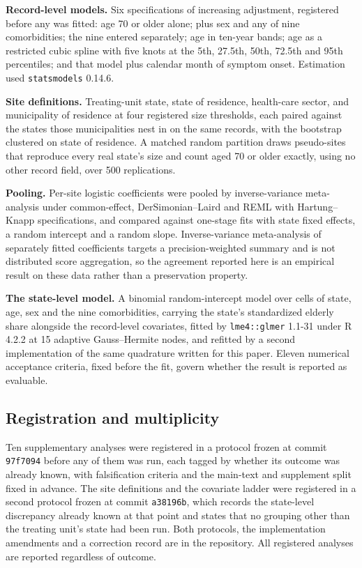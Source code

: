 \documentclass[11pt]{article}
\begin{document}
\textbf{Record-level models.}  Six specifications of increasing
adjustment, registered before any was fitted: age 70 or older alone;
plus sex and any of nine comorbidities; the nine entered separately;
age in ten-year bands; age as a restricted cubic spline with five knots
at the 5th, 27.5th, 50th, 72.5th and 95th percentiles; and that model
plus calendar month of symptom onset.  Estimation used
\texttt{statsmodels} 0.14.6.

\textbf{Site definitions.}  Treating-unit state, state of residence,
health-care sector, and municipality of residence at four registered
size thresholds, each paired against the states those municipalities
nest in on the same records, with the bootstrap clustered on state of
residence.  A matched random partition draws pseudo-sites that
reproduce every real state's size and count aged 70 or older exactly,
using no other record field, over 500 replications.

\textbf{Pooling.}  Per-site logistic coefficients were pooled by
inverse-variance meta-analysis under common-effect, DerSimonian--Laird
and REML with Hartung--Knapp specifications, and compared against
one-stage fits with state fixed effects, a random intercept and a random
slope.  Inverse-variance meta-analysis of separately fitted coefficients
targets a precision-weighted summary and is not distributed score
aggregation, so the agreement reported here is an empirical result on
these data rather than a preservation property.

\textbf{The state-level model.}  A binomial random-intercept model over
cells of state, age, sex and the nine comorbidities, carrying the
state's standardized elderly share alongside the record-level
covariates, fitted by \texttt{lme4::glmer} 1.1-31 under R 4.2.2 at 15
adaptive Gauss--Hermite nodes, and refitted by a second implementation
of the same quadrature written for this paper.  Eleven numerical acceptance criteria, fixed before the
fit, govern whether the result is reported as evaluable.

\subsection{Registration and multiplicity}

Ten supplementary analyses were registered in a protocol frozen at
commit \texttt{97f7094} before any of them was run, each tagged by
whether its outcome was already known, with falsification criteria and
the main-text and supplement split fixed in advance.  The site
definitions and the covariate ladder were registered in a second
protocol frozen at commit \texttt{a38196b}, which records the
state-level discrepancy already known at that point and states that no
grouping other than the treating unit's state had been run.  Both
protocols, the implementation amendments and a correction record are in
the repository.  All registered analyses are reported regardless of
outcome.
\end{document}
